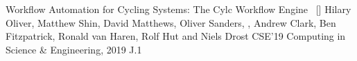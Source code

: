 \begin{publications}
\publication
	{Workflow Automation for Cycling Systems: The Cylc Workflow Engine}{~ [\href{https://ieeexplore.ieee.org/document/8675433}{\small{\linkSymbol}}]}
	{Hilary Oliver, Matthew Shin, David Matthews, Oliver Sanders, \underline{}, Andrew Clark, Ben Fitzpatrick, Ronald van Haren, Rolf Hut and Niels Drost}
	{CSE'19} {Computing in Science \& Engineering, 2019} {J.1}



\end{publications}

\vspace{-3mm}